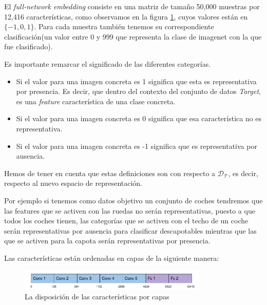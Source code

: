 \documentclass[12,twoside]{TFG-GM}
\theoremstyle{definition}
\theoremstyle{remark}
\begin{document}
El \textit{full-network embedding} consiste en una matriz de tamaño 50,000 muestras por 12,416 características, como observamos en la figura \ref{fig:featuresperlayer}, cuyos valores están en $\{-1,0,1\}$. Para cada muestra también tenemos su correspondiente clasificación(un valor entre 0 y 999 que representa la clase de imagenet con la que fue clasificado).

Es importante remarcar el significado de las diferentes categorías.
\begin{itemize}
\item Si el valor para una imagen concreta es 1 significa que esta es representativa por presencia. Es decir, que dentro del contexto del conjunto de datos \textit{Target}, es una \textit{feature} característica de una clase concreta.
\item Si el valor para una imagen concreta es 0 significa que esa característica no es representativa.
\item Si el valor para una imagen concreta es -1 significa que es representativa por ausencia. 
\end{itemize}

Hemos de tener en cuenta que estas definiciones son con respecto a $\mathcal{D_T}$, es decir, respecto al nuevo espacio de representación. 

Por ejemplo si tenemos como datos objetivo un conjunto de coches tendremos que las features que se activen con las ruedas no serán representativas, puesto a que todos los coches tienen, las categorías que se activen con el techo de un coche serán representativas por ausencia para clasificar descapotables mientras que las que se activen para la capota serán representativas por presencia. 

Las características están ordenadas en capas de la siguiente manera: 
\begin{figure}[H]
\label{}
\centering
\includegraphics[width = 0.8\textwidth]{Images/croplayer.png} 
\caption{La disposición de las características por capas \label{fig:featuresperlayer}}
\end{figure}

\end{document}
